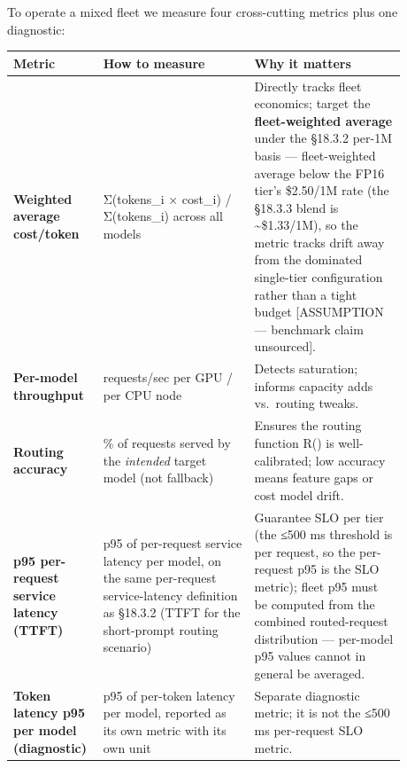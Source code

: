 
\label{measurement}


To operate a mixed fleet we measure four cross-cutting metrics plus one
diagnostic:

\nopagebreak[4]
\begin{longtable}[]{@{}
  >{\raggedright\arraybackslash}p{0.1576\linewidth}
  >{\raggedright\arraybackslash}p{0.3602\linewidth}
  >{\raggedright\arraybackslash}p{0.3602\linewidth}@{}}
\toprule\noalign{}
\begin{minipage}[b]{\linewidth}\raggedright
Metric
\end{minipage} & \begin{minipage}[b]{\linewidth}\raggedright
How to measure
\end{minipage} & \begin{minipage}[b]{\linewidth}\raggedright
Why it matters
\end{minipage} \\
\midrule\noalign{}
\endhead
\bottomrule\noalign{}
\endlastfoot
\textbf{Weighted average cost/token} & Σ(tokens\_i × cost\_i) /
Σ(tokens\_i) across all models & Directly tracks fleet economics; target
the \textbf{fleet-weighted average} under the §18.3.2 per-1M basis ---
fleet-weighted average below the FP16 tier's \$2.50/1M rate (the §18.3.3
blend is \textasciitilde\$1.33/1M), so the metric tracks drift away from
the dominated single-tier configuration rather than a tight budget
{[}ASSUMPTION --- benchmark claim unsourced{]}. \\
\noalign{\label{tab:18.4}}
\textbf{Per-model throughput} & requests/sec per GPU / per CPU node &
Detects saturation; informs capacity adds vs.~routing tweaks. \\
\textbf{Routing accuracy} & \% of requests served by the \emph{intended}
target model (not fallback) & Ensures the routing function R() is
well-calibrated; low accuracy means feature gaps or cost model drift. \\
\textbf{p95 per-request service latency (TTFT)} & p95 of per-request
service latency per model, on the same per-request service-latency
definition as §18.3.2 (TTFT for the short-prompt routing scenario) &
Guarantee SLO per tier (the ≤500 ms threshold is per request, so the
per-request p95 is the SLO metric); fleet p95 must be computed from the
combined routed-request distribution --- per-model p95 values cannot in
general be averaged. \\
\textbf{Token latency p95 per model (diagnostic)} & p95 of per-token
latency per model, reported as its own metric with its own unit &
Separate diagnostic metric; it is not the ≤500 ms per-request SLO
metric. \\
\end{longtable}

